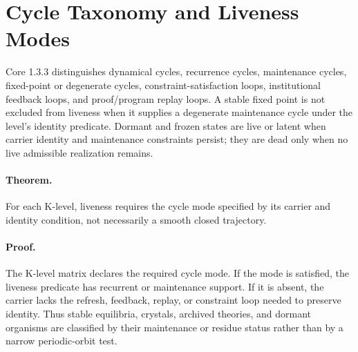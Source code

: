 
\section{Cycle Taxonomy and Liveness Modes}
\label{sec:oc133-cycle-taxonomy}

Core 1.3.3 distinguishes dynamical cycles, recurrence cycles, maintenance
cycles, fixed-point or degenerate cycles, constraint-satisfaction loops,
institutional feedback loops, and proof/program replay loops.  A stable fixed
point is not excluded from liveness when it supplies a degenerate maintenance
cycle under the level's identity predicate.  Dormant and frozen states are live
or latent when carrier identity and maintenance constraints persist; they are
dead only when no live admissible realization remains.

\paragraph{Theorem.}
For each K-level, liveness requires the cycle mode specified by its carrier and
identity condition, not necessarily a smooth closed trajectory.

\paragraph{Proof.}
The K-level matrix declares the required cycle mode.  If the mode is satisfied,
the liveness predicate has recurrent or maintenance support.  If it is absent,
the carrier lacks the refresh, feedback, replay, or constraint loop needed to
preserve identity.  Thus stable equilibria, crystals, archived theories, and
dormant organisms are classified by their maintenance or residue status rather
than by a narrow periodic-orbit test.

